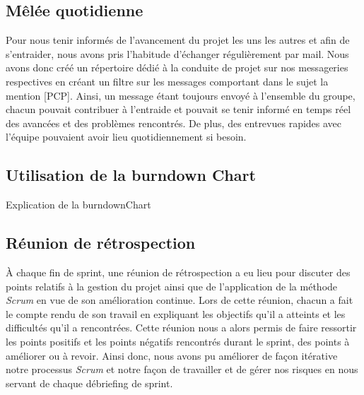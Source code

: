 \subsection{Mêlée quotidienne}

Pour nous tenir informés de l'avancement du projet les uns les autres et afin de s'entraider, nous avons pris l'habitude d'échanger régulièrement par mail. Nous avons donc créé un répertoire dédié à la conduite de projet sur nos messageries respectives en créant un filtre sur les messages comportant dans le sujet la mention [PCP].
Ainsi, un message étant toujours envoyé à l'ensemble du groupe, chacun pouvait contribuer à l'entraide et pouvait se tenir informé en temps réel des avancées et des problèmes rencontrés. De plus, des entrevues rapides avec l'équipe pouvaient avoir lieu quotidiennement si besoin.

\subsection{Utilisation de la burndown Chart}

Explication de la burndownChart

\subsection{Réunion de rétrospection}

À chaque fin de sprint, une réunion de rétrospection a eu lieu pour discuter des points relatifs à la gestion du projet ainsi que de l'application de la méthode \emph{Scrum} en vue de son amélioration continue. Lors de cette réunion, chacun a fait le compte rendu de son travail en expliquant les objectifs qu'il a atteints et les difficultés qu'il a rencontrées. Cette réunion nous a alors permis de faire ressortir les points positifs et les points négatifs rencontrés durant le sprint, des points à améliorer ou à revoir. Ainsi donc, nous avons pu améliorer de façon itérative notre processus \emph{Scrum} et notre façon de travailler et de gérer nos risques en nous servant de chaque débriefing de sprint.  